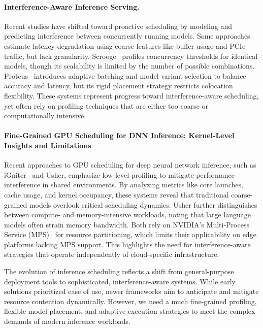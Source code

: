 \paragraph{Interference-Aware Inference Serving.}
Recent studies have shifted toward proactive scheduling by modeling and predicting interference between concurrently running models. Some approaches estimate latency degradation using coarse features like buffer usage and PCIe traffic, but lack granularity. Scrooge~\cite{hu2021scrooge} profiles concurrency thresholds for identical models, though its scalability is limited by the number of possible combinations. Proteus~\cite{ahmad2024proteus} introduces adaptive batching and model variant selection to balance accuracy and latency, but its rigid placement strategy restricts colocation flexibility. These systems represent progress toward interference-aware scheduling, yet often rely on profiling techniques that are either too coarse or computationally intensive.

\paragraph{Fine-Grained GPU Scheduling for DNN Inference: Kernel-Level Insights and Limitations}
Recent approaches to GPU scheduling for deep neural network inference, such as iGniter~\cite{xu2022igniter} and Usher, emphasize low-level profiling to mitigate performance interference in shared environments. By analyzing metrics like core launches, cache usage, and kernel occupancy, these systems reveal that traditional coarse-grained models overlook critical scheduling dynamics. Usher further distinguishes between compute- and memory-intensive workloads, noting that large language models often strain memory bandwidth. Both rely on NVIDIA's Multi-Process Service (MPS)~\cite{} for resource partitioning, which limits their applicability on edge platforms lacking MPS support. This highlights the need for interference-aware strategies that operate independently of cloud-specific infrastructure.

The evolution of inference scheduling reflects a shift from general-purpose deployment tools to sophisticated, interference-aware systems. While early solutions prioritized ease of use, newer frameworks aim to anticipate and mitigate resource contention dynamically. However, we need a much fine-grained profiling, flexible model placement, and adaptive execution strategies to meet the complex demands of modern inference workloads.

